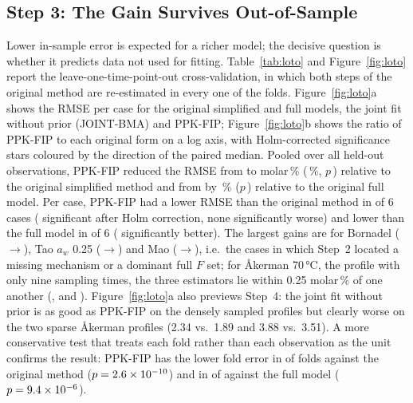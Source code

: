 
\subsection{Step 3: The Gain Survives Out-of-Sample}
Lower in-sample error is expected for a richer model; the decisive question is whether it predicts data not used for fitting. Table~\ref{tab:loto} and Figure~\ref{fig:loto} report the leave-one-time-point-out cross-validation, in which both steps of the original method are re-estimated in every one of the \NLotoFolds{} folds. Figure~\ref{fig:loto}a shows the RMSE per case for the original simplified and full models, the joint fit without prior (JOINT-BMA) and PPK-FIP; Figure~\ref{fig:loto}b shows the ratio of PPK-FIP to each original form on a log axis, with Holm-corrected significance stars coloured by the direction of the paired median. Pooled over all \NFitPoints{} held-out observations, PPK-FIP reduced the RMSE from \LotoAllOrig{} to \LotoAllNew{} molar\,\% (\LotoAllRedOrig\,\%, $p$\,\LotoAllPOrig) relative to the original simplified method and from \LotoAllFull{} by \LotoAllRedFull\,\% ($p$\,\LotoAllPFull) relative to the original full model. Per case, PPK-FIP had a lower RMSE than the original method in \LotoWinsOrig{} of 6 cases (\LotoSigWinsOrig{} significant after Holm correction, none significantly worse) and lower than the full model in \LotoWinsFull{} of 6 (\LotoSigWinsFull{} significantly better). The largest gains are for Bornadel (\LotoBornOrig$\to$\LotoBornNew), Tao $a_w$ 0.25 (\LotoTaoAOrig$\to$\LotoTaoANew) and Mao (\LotoMaoOrig$\to$\LotoMaoNew), i.e.\ the cases in which Step~2 located a missing mechanism or a dominant full $F$ set; for Åkerman 70\,°C, the profile with only nine sampling times, the three estimators lie within 0.25 molar\,\% of one another (\LotoAkSeventyNew, \LotoAkSeventyOrig{} and \LotoAkSeventyFull). Figure~\ref{fig:loto}a also previews Step~4: the joint fit without prior is as good as PPK-FIP on the densely sampled profiles but clearly worse on the two sparse Åkerman profiles (2.34 vs.\ 1.89 and 3.88 vs.\ 3.51). A more conservative test that treats each fold rather than each observation as the unit confirms the result: PPK-FIP has the lower fold error in \FoldWinsOrig{} of \FoldN{} folds against the original method ($p=2.6\times10^{-10}$) and in \FoldWinsFull{} of \FoldN{} against the full model ($p=9.4\times10^{-6}$).
